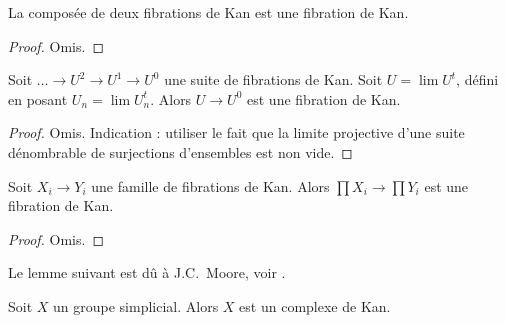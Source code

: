 \begin{lemma}
\label{lemma-kan-composition}
La composée de deux fibrations de Kan est une fibration de Kan.
\end{lemma}

\begin{proof}
Omis.
\end{proof}

\begin{lemma}
\label{lemma-limit-kan}
Soit $\ldots \to U^2 \to U^1 \to U^0$ une suite de fibrations de Kan.
Soit $U = \lim U^t$, défini en posant $U_n = \lim U_n^t$.
Alors $U \to U^0$ est une fibration de Kan.
\end{lemma}

\begin{proof}
Omis. Indication : utiliser le fait que la limite projective d'une suite
dénombrable de surjections d'ensembles est non vide.
\end{proof}

\begin{lemma}
\label{lemma-product-kan}
Soit $X_i \to Y_i$ une famille de fibrations de Kan. Alors
$\prod X_i \to \prod Y_i$ est une fibration de Kan.
\end{lemma}

\begin{proof}
Omis.
\end{proof}

\noindent
Le lemme suivant est dû à J.C.\ Moore, voir \cite{Moore-Cartan}.

\begin{lemma}
\label{lemma-simplicial-group-kan}
Soit $X$ un groupe simplicial. Alors $X$ est un complexe de Kan.
\end{lemma}


